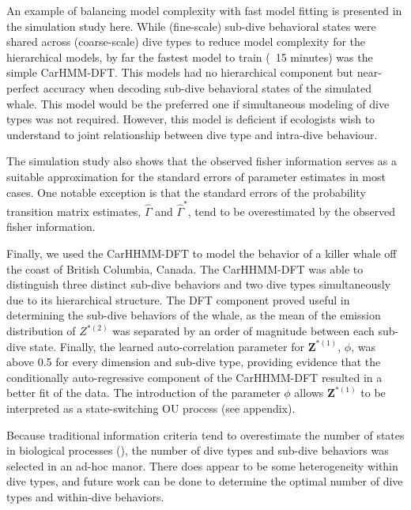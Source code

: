 An example of balancing model complexity with fast model fitting is presented in the simulation study here. While (fine-scale) sub-dive behavioral states were shared across (coarse-scale) dive types to reduce model complexity for the hierarchical models, by far the fastest model to train (~15 minutes) was the simple CarHMM-DFT. This models had no hierarchical component but near-perfect accuracy when decoding sub-dive behavioral states of the simulated whale. This model would be the preferred one if simultaneous modeling of dive types was not required. However, this model is deficient if ecologists wish to understand to joint relationship between dive type and intra-dive behaviour. 

The simulation study also shows that the observed fisher information serves as a suitable approximation for the standard errors of parameter estimates in most cases. One notable exception is that the standard errors of the probability transition matrix estimates, $\hat \Gamma$ and $\hat \Gamma^*$, tend to be overestimated by the observed fisher information.

Finally, we used the CarHHMM-DFT to model the behavior of a killer whale off the coast of British Columbia, Canada. The CarHHMM-DFT was able to distinguish three distinct sub-dive behaviors and two dive types simultaneously due to its hierarchical structure. The DFT component proved useful in determining the sub-dive behaviors of the whale, as the mean of the emission distribution of $Z^{*(2)}$ was separated by an order of magnitude between each sub-dive state. Finally, the learned auto-correlation parameter for $\mathbf{Z}^{*(1)}$, $\phi$, was above 0.5 for every dimension and sub-dive type, providing evidence that the conditionally auto-regressive component of the CarHHMM-DFT resulted in a better fit of the data. The introduction of the parameter $\phi$ allows $\mathbf{Z}^{*(1)}$ to be interpreted as a state-switching OU process (see appendix).

Because traditional information criteria tend to overestimate the number of states in biological processes (\citep{Pohle:2017}), the number of dive types and sub-dive behaviors was selected in an ad-hoc manor. There does appear to be some heterogeneity within dive types, and future work can be done to determine the optimal number of dive types and within-dive behaviors.